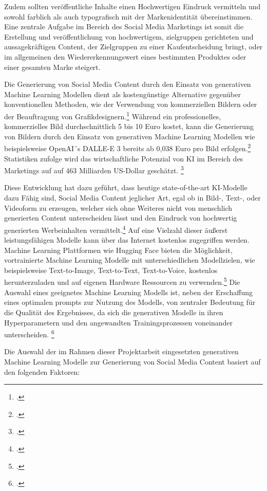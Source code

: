 Zudem sollten veröffentliche Inhalte einen Hochwertigen Eindruck vermitteln und sowohl farblich als auch typografisch mit der Markenidentität übereinstimmen.
Eine zentrale Aufgabe im Bereich des Social Media Marketings ist somit die Erstellung und veröffentlichung von hochwertigem, zielgruppen gerichteten und aussagekräftigen Content, der Zielgruppen zu einer Kaufentscheidung bringt, oder im allgemeinen den Wiedererkennungswert eines bestimmten Produktes oder einer gesamten Marke steigert.

Die Generierung von Social Media Content durch den Einsatz von generativen Machine Learning Modellen dient als kostengünstige Alternative gegenüber konventionellen Methoden, wie der Verwendung von kommerziellen Bildern oder der Beauftragung von Grafikdesignern.\footcite[1-2]{hartmann2024power}
Während ein professionelles, kommerzielles Bild durchschnittlich 5 bis 10 Euro kostet, kann die Generierung von Bildern durch den Einsatz von generativen Machine Learning Modellen wie beispielsweise OpenAI´s DALLE-E 3 bereits ab 0,038 Euro pro Bild erfolgen.\footcite{betker2023improving}
Statistiken zufolge wird das wirtschaftliche Potenzial von KI im Bereich des Marketings auf auf 463 Milliarden US-Dollar geschätzt. \footcite{chui2023economic}

Diese Entwicklung hat dazu geführt, dass heutige state-of-the-art KI-Modelle dazu Fähig sind, Social Media Content jeglicher Art, egal ob in Bild-, Text-, oder Videoform zu erzeugen, welcher sich ohne Weiteres nicht von menschlich generierten Content unterscheiden lässt und den Eindruck von hochwertig generierten Werbeinhalten vermittelt.\footcite[1]{hartmann2024power}
Auf eine Vielzahl dieser äußerst leistungsfähigen Modelle kann über das Internet kostenlos zugegriffen werden.
Machine Learning Plattformen wie Hugging Face bieten die Möglichkeit, vortrainierte Machine Learning Modelle mit unterschiedlichen Modellzielen, wie beispielsweise Text-to-Image, Text-to-Text, Text-to-Voice, kostenlos herunterzuladen und auf eigenen Hardware Ressourcen zu verwenden.\footcite{huggingface}
Die Auswahl eines geeignetes Machine Learning Modells ist, neben der Erschaffung eines optimalen prompts zur Nutzung des Modells, von zentraler Bedeutung für die Qualität des Ergebnisses, da sich die generativen Modelle in ihren Hyperparametern und den angewandten Trainingsprozessen voneinander unterscheiden. \footcite[S. 9 ff.]{betker2023improving}

Die Auswahl der im Rahmen dieser Projektarbeit eingesetzten generativen Machine Learning Modelle zur Generierung von Social Media Content basiert auf den folgenden Faktoren:

